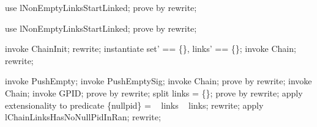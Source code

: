 \begin{forget}
use lNonEmptyLinksStartLinked;
prove by rewrite;
\end{forget}

\begin{forget}
use lNonEmptyLinksStartLinked;
prove by rewrite;
\end{forget}

\begin{forget}[tPREChainInit]
invoke ChainInit;
rewrite;
instantiate set' == \{\}, links' == \{\};
invoke Chain;
rewrite;
\end{forget}

\begin{forget}[tPREPushEmpty]
invoke PushEmpty;
invoke PushEmptySig;
invoke \Delta Chain;
prove by rewrite;
invoke Chain;
invoke GPID;
prove by rewrite;
split links = \{\};
prove by rewrite;
apply extensionality to predicate \{nullpid\} = \ran~  links \setminus  \dom~ links;
rewrite;
apply lChainLinksHasNoNullPidInRan;
rewrite;
\end{forget}

